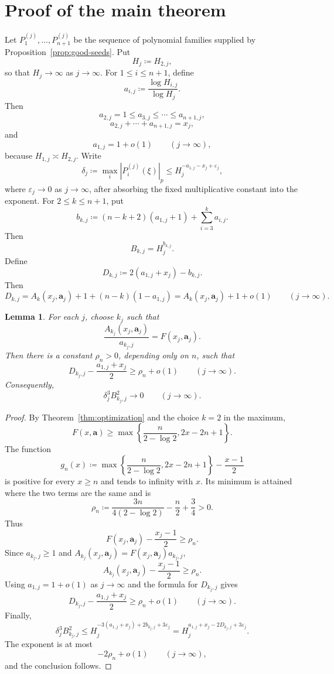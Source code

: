 \documentclass[12pt,reqno]{amsart}
\newtheorem{lemma}[theorem]{Lemma}
\theoremstyle{definition}
\theoremstyle{remark}
\begin{document}
\bigskip
\section{\bf Proof of the main theorem}
\bigskip

Let $P_1^{(j)},\ldots,P_{n+1}^{(j)}$ be the sequence of polynomial families
supplied by Proposition~\ref{prop:good-seeds}. Put
$$
H_j\coloneqq H_{2,j},
$$
so that $H_j\to\infty$ as $j\to\infty$. For $1\leq i\leq n+1$, define
$$
a_{i,j}\coloneqq\frac{\log H_{i,j}}{\log H_j}.
$$
Then
$$
a_{2,j}=1\leq a_{3,j}\leq\cdots\leq a_{n+1,j},
$$
$$
a_{2,j}+\cdots+a_{n+1,j}=x_j,
$$
and
$$
a_{1,j}=1+o(1)\qquad(j\to\infty),
$$
because $H_{1,j}\asymp H_{2,j}$. Write
$$
\delta_j
\coloneqq\max_i|P_i^{(j)}(\xi)|_p
\leq H_j^{-a_{1,j}-x_j+\varepsilon_j},
$$
where $\varepsilon_j\to0$ as $j\to\infty$, after absorbing the fixed
multiplicative constant into the exponent. For $2\leq k\leq n+1$, put
$$
b_{k,j}\coloneqq(n-k+2)(a_{1,j}+1)+\sum_{i=3}^ka_{i,j}.
$$
Then
$$
B_{k,j}=H_j^{b_{k,j}}.
$$
Define
$$
D_{k,j}\coloneqq2(a_{1,j}+x_j)-b_{k,j}.
$$
Then
$$
D_{k,j}
=A_k(x_j,\mathbf a_j)+1+(n-k)(1-a_{1,j})
=A_k(x_j,\mathbf a_j)+1+o(1)\qquad(j\to\infty).
$$

\begin{lemma}\label{lem:hensel-margin}
For each $j$, choose $k_j$ such that
$$
\frac{A_{k_j}(x_j,\mathbf a_j)}{a_{k_j,j}}=F(x_j,\mathbf a_j).
$$
Then there is a constant $\rho_n>0$, depending only on $n$, such that
$$
D_{k_j,j}-\frac{a_{1,j}+x_j}{2}\geq\rho_n+o(1)
\qquad(j\to\infty).
$$
Consequently,
$$
\delta_j^3B_{k_j,j}^2\longrightarrow0
\qquad(j\to\infty).
$$
\end{lemma}

\begin{proof}
By Theorem~\ref{thm:optimization} and the choice $k=2$ in the maximum,
$$
F(x,\mathbf a)
\geq
\max\left\{
\frac{n}{2-\log2},
2x-2n+1
\right\}.
$$
The function
$$
g_n(x)
\coloneqq
\max\left\{
\frac{n}{2-\log2},
2x-2n+1
\right\}
-\frac{x-1}{2}
$$
is positive for every $x\geq n$ and tends to infinity with $x$. Its minimum is attained where the two terms are the same and is
$$
\rho_n
\coloneqq
\frac{3n}{4(2-\log2)}-\frac n2+\frac34>0.
$$
Thus
$$
F(x_j,\mathbf a_j)-\frac{x_j-1}{2}\geq\rho_n.
$$
Since $a_{k_j,j}\geq1$ and
$A_{k_j}(x_j,\mathbf a_j)=F(x_j,\mathbf a_j)a_{k_j,j}$,
$$
A_{k_j}(x_j,\mathbf a_j)-\frac{x_j-1}{2}\geq\rho_n.
$$
Using $a_{1,j}=1+o(1)$ as $j\to\infty$ and the formula for $D_{k_j,j}$ gives
$$
D_{k_j,j}-\frac{a_{1,j}+x_j}{2}
\geq\rho_n+o(1)\qquad(j\to\infty).
$$
Finally,
$$
\delta_j^3B_{k_j,j}^2
\leq
H_j^{-3(a_{1,j}+x_j)+2b_{k_j,j}+3\varepsilon_j}
=H_j^{a_{1,j}+x_j-2D_{k_j,j}+3\varepsilon_j}.
$$
The exponent is at most
$$
-2\rho_n+o(1)\qquad(j\to\infty),
$$
and the conclusion follows.
\end{proof}
\end{document}

